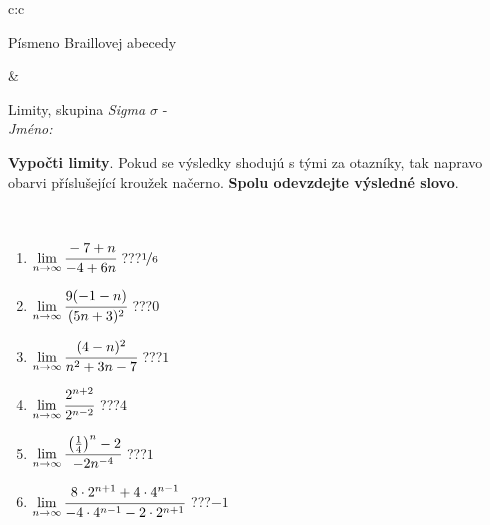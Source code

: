 \documentclass[10pt]{report}
\begin{document}
\begin{tabular}{c:c}
\begin{minipage}[c][104.5mm][t]{0.5\linewidth}
\begin{center}
\begin{minipage}{0.20\linewidth}
\begin{center}
{\small Písmeno Braillovej abecedy}
\end{center}
\end{minipage}
\end{center}
\end{minipage}
&
\begin{minipage}[c][104.5mm][t]{0.5\linewidth}
\begin{center}
\vspace{7mm}
{\huge Limity, skupina \textit{Sigma $\sigma$} -}\\[5mm]
\textit{Jméno:}\phantom{xxxxxxxxxxxxxxxxxxxxxxxxxxxxxxxxxxxxxxxxxxxxxxxxxxxxxxxxxxxxxxxxx}\\[5mm]
\begin{minipage}{0.95\linewidth}
\begin{center}
\textbf{Vypočti limity}. Pokud se výsledky shodujú s tými za otazníky, tak napravo\\obarvi příslušející kroužek načerno. \textbf{Spolu odevzdejte výsledné slovo}.
\end{center}
\end{minipage}
\\[1mm]
\begin{minipage}{0.79\linewidth}
\begin{center}
\begin{varwidth}{\linewidth}
\begin{enumerate}
\normalsize
\item $\lim\limits_{n\to\infty}\cfrac{-7+n}{-4+6n}$\quad \dotfill\; ???\;\dotfill \quad $\nicefrac{1}{6}$
\item $\lim\limits_{n\to\infty}\cfrac{9(-1-n)}{(5n+3)^2}$\quad \dotfill\; ???\;\dotfill \quad $0$
\item $\lim\limits_{n\to\infty}\cfrac{(4-n)^2}{n^2+3n-7}$\quad \dotfill\; ???\;\dotfill \quad $1$
\item $\lim\limits_{n\to\infty}\cfrac{2^{n+2}}{2^{n-2}}$\quad \dotfill\; ???\;\dotfill \quad $4$
\item $\lim\limits_{n\to\infty}\cfrac{\left(\frac{1}{4}\right)^n -2}{-2n^{-4}}$\quad \dotfill\; ???\;\dotfill \quad $1$
\item $\lim\limits_{n\to\infty}\cfrac{8\cdot 2^{n+1}+4\cdot 4^{n-1}}{-4\cdot 4^{n-1}-2\cdot 2^{n+1}}$\quad \dotfill\; ???\;\dotfill \quad $-1$
\end{enumerate}
\end{varwidth}
\end{center}
\end{minipage}
\begin{minipage}{0.20\linewidth}

\end{minipage}
\end{center}
\end{minipage}
\end{tabular}
\end{document}
